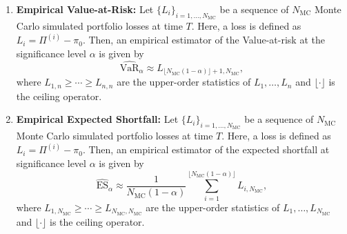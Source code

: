 \begin{enumerate}
    \begin{equation*}
        \text{Calmar Ratio} = \frac{R_\text{annual}}{\text{MDD}}.
    \end{equation*}
    \item \textbf{Empirical Value-at-Risk:} Let $\{L_i\}_{i = 1, \ldots, N_\text{MC}}$ be a sequence of $N_\text{MC}$ Monte Carlo simulated portfolio losses at time $T$. Here, a loss is defined as $L_i = \Pi^{(i)}-\pi_0$. Then, an empirical estimator of the Value-at-risk at the significance level $\alpha$ is given by 
    \begin{equation*}
        \widehat{\text{VaR}}_\alpha \approx L_{\lfloor N_\text{MC}(1-\alpha) \rfloor+1,N_\text{MC}},
    \end{equation*}
    where $L_{1,n} \geq \cdots \geq L_{n,n}$ are the upper-order statistics of $L_1, \ldots, L_n$ and $\lfloor \cdot \rfloor$ is the ceiling operator. 
    \item \textbf{Empirical Expected Shortfall:} Let $\{L_i\}_{i = 1, \ldots, N_\text{MC}}$ be a sequence of $N_\text{MC}$ Monte Carlo simulated portfolio losses at time $T$. Here, a loss is defined as $L_i = \Pi^{(i)}-\pi_0$. Then, an empirical estimator of the expected shortfall at significance level $\alpha$ is given by
    \begin{equation*}
        \widehat{\text{ES}}_\alpha \approx \frac{1}{N_\text{MC}(1-\alpha)} \sum_{i=1}^{\lfloor N_\text{MC}(1-\alpha) \rfloor} L_{i,N_\text{MC}},
    \end{equation*}
    where $L_{1,N_\text{MC}} \geq \cdots \geq L_{N_\text{MC},N_\text{MC}}$ are the upper-order statistics of $L_1, \ldots, L_{N_\text{MC}}$ and $\lfloor \cdot \rfloor$ is the ceiling operator. 
\end{enumerate}

\clearpage
